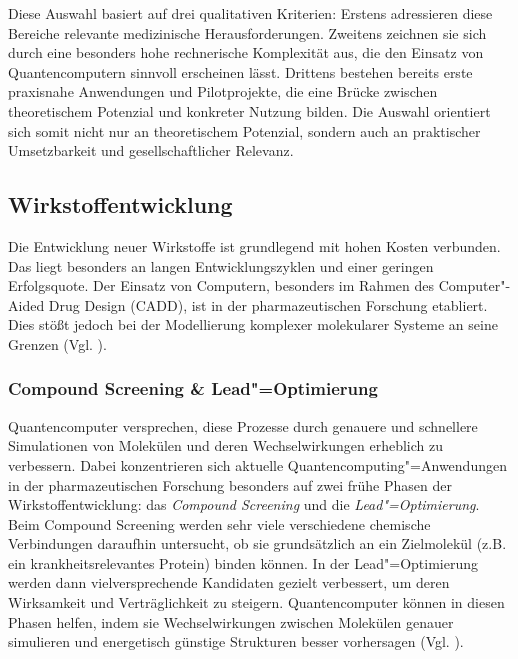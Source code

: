 Diese Auswahl basiert auf drei qualitativen Kriterien: Erstens adressieren diese Bereiche relevante medizinische Herausforderungen. Zweitens zeichnen sie sich durch eine besonders hohe rechnerische Komplexität aus, die den Einsatz von Quantencomputern sinnvoll erscheinen lässt. Drittens bestehen bereits erste praxisnahe Anwendungen und Pilotprojekte, die eine Brücke zwischen theoretischem Potenzial und konkreter Nutzung bilden. Die Auswahl orientiert sich somit nicht nur an theoretischem Potenzial, sondern auch an praktischer Umsetzbarkeit und gesellschaftlicher Relevanz.\\

\subsection{Wirkstoffentwicklung}
Die Entwicklung neuer Wirkstoffe ist grundlegend mit hohen Kosten verbunden. Das liegt besonders an langen Entwicklungszyklen und einer geringen Erfolgsquote. Der Einsatz von Computern, besonders im Rahmen des Computer"-Aided Drug Design (CADD), ist in der pharmazeutischen Forschung etabliert. Dies stößt jedoch bei der Modellierung komplexer molekularer Systeme an seine Grenzen (Vgl. \cite{bertl_quantum_2025}).\\

\subsubsection*{Compound Screening \& Lead"=Optimierung}
Quantencomputer versprechen, diese Prozesse durch genauere und schnellere Simulationen von Molekülen und deren Wechselwirkungen erheblich zu verbessern. Dabei konzentrieren sich aktuelle Quantencomputing"=Anwendungen in der pharmazeutischen Forschung besonders auf zwei frühe Phasen der Wirkstoffentwicklung: das \textit{Compound Screening} und die \textit{Lead"=Optimierung}. Beim Compound Screening werden sehr viele verschiedene chemische Verbindungen daraufhin untersucht, ob sie grundsätzlich an ein Zielmolekül (z.B. ein krankheitsrelevantes Protein) binden können. In der Lead"=Optimierung werden dann vielversprechende Kandidaten gezielt verbessert, um deren Wirksamkeit und Verträglichkeit zu steigern. Quantencomputer können in diesen Phasen helfen, indem sie Wechselwirkungen zwischen Molekülen genauer simulieren und energetisch günstige Strukturen besser vorhersagen (Vgl. \cite{zinner_quantum_2021}).\\

